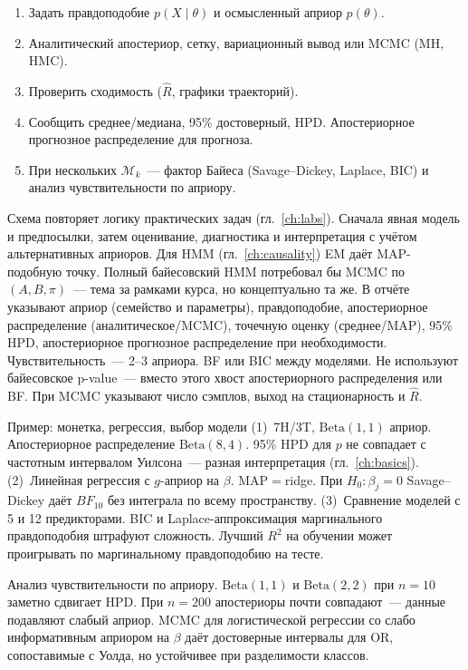 \begin{enumerate}
    \item Задать правдоподобие $p(X\mid\theta)$ и осмысленный априор $p(\theta)$.
    \item Аналитический апостериор, сетку, вариационный вывод или MCMC (MH, HMC).
    \item Проверить сходимость ($\hat R$, графики траекторий).
    \item Сообщить среднее/медиана, 95\% достоверный, HPD. Апостериорное прогнозное распределение
          для прогноза.
    \item При нескольких $\mathcal{M}_k$~--- фактор Байеса (Savage--Dickey,
          Laplace, BIC) и анализ чувствительности по априору.
\end{enumerate}
Схема повторяет логику практических задач (гл.~\ref{ch:labs}). Сначала явная модель и предпосылки, затем оценивание, диагностика и интерпретация с учётом альтернативных априоров.
Для HMM (гл.~\ref{ch:causality}) EM даёт MAP-подобную точку. Полный байесовский HMM потребовал бы MCMC по $(A,B,\pi)$~--- тема за рамками курса, но концептуально та же.
В отчёте указывают априор (семейство и параметры), правдоподобие, апостериорное распределение (аналитическое/MCMC), точечную оценку (среднее/MAP), 95\% HPD, апостериорное прогнозное распределение при необходимости. Чувствительность~--- 2--3 априора. BF или BIC между моделями. Не используют байесовское p-value~--- вместо этого хвост апостериорного распределения или BF. При MCMC указывают число сэмплов, выход на стационарность и $\hat R$.

Пример: монетка, регрессия, выбор модели (1)~7H/3T, $\mathrm{Beta}(1,1)$ априор. Апостериорное распределение $\mathrm{Beta}(8,4)$. 95\% HPD для $p$ не совпадает с частотным интервалом Уилсона~--- разная интерпретация (гл.~\ref{ch:basics}).
(2)~Линейная регрессия с $g$-априор на $\beta$. MAP$=$ridge. При $H_0\colon\beta_j=0$ Savage--Dickey даёт $BF_{10}$ без интеграла по всему пространству.
(3)~Сравнение моделей с 5 и 12 предикторами. BIC и Laplace-аппроксимация маргинального правдоподобия штрафуют сложность. Лучший $R^2$ на обучении может проигрывать по маргинальному правдоподобию на тесте.

Анализ чувствительности по априору. $\mathrm{Beta}(1,1)$ и $\mathrm{Beta}(2,2)$ при $n=10$ заметно сдвигает HPD. При $n=200$ апостериоры почти совпадают~--- данные подавляют слабый априор. MCMC для логистической регрессии со слабо информативным априором на $\beta$ даёт достоверные интервалы для OR, сопоставимые с Уолда, но устойчивее при разделимости классов.

